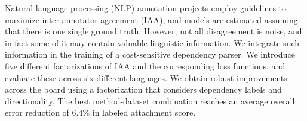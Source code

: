 Natural language processing (NLP) annotation projects employ guidelines to maximize inter-annotator agreement (IAA), and models are estimated assuming that there is one single ground truth. However, not all disagreement is noise, and in fact some of it may contain valuable linguistic information. We integrate such information in the training of a cost-sensitive dependency parser. We introduce five different factorizations of IAA and the corresponding loss functions, and evaluate these across six different languages. We obtain robust improvements across the board using a factorization that considers dependency labels and directionality. The best method-dataset combination reaches an average overall error reduction of 6.4\% in labeled attachment score.
